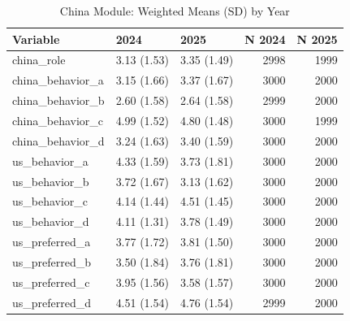 \begin{table}[!h]
\centering
\caption{China Module: Weighted Means (SD) by Year}
\centering
\begin{tabular}[t]{lllrr}
\toprule
Variable & 2024 & 2025 & N 2024 & N 2025\\
\midrule
china\_role & 3.13 (1.53) & 3.35 (1.49) & 2998 & 1999\\
china\_behavior\_a & 3.15 (1.66) & 3.37 (1.67) & 3000 & 2000\\
china\_behavior\_b & 2.60 (1.58) & 2.64 (1.58) & 2999 & 2000\\
china\_behavior\_c & 4.99 (1.52) & 4.80 (1.48) & 3000 & 1999\\
china\_behavior\_d & 3.24 (1.63) & 3.40 (1.59) & 3000 & 2000\\
us\_behavior\_a & 4.33 (1.59) & 3.73 (1.81) & 3000 & 2000\\
us\_behavior\_b & 3.72 (1.67) & 3.13 (1.62) & 3000 & 2000\\
us\_behavior\_c & 4.14 (1.44) & 4.51 (1.45) & 3000 & 2000\\
us\_behavior\_d & 4.11 (1.31) & 3.78 (1.49) & 3000 & 2000\\
us\_preferred\_a & 3.77 (1.72) & 3.81 (1.50) & 3000 & 2000\\
us\_preferred\_b & 3.50 (1.84) & 3.76 (1.81) & 3000 & 2000\\
us\_preferred\_c & 3.95 (1.56) & 3.58 (1.57) & 3000 & 2000\\
us\_preferred\_d & 4.51 (1.54) & 4.76 (1.54) & 2999 & 2000\\
\bottomrule
\end{tabular}
\end{table}
